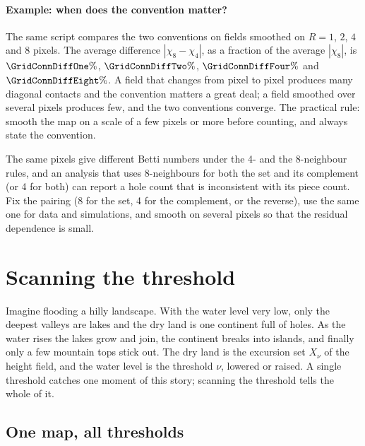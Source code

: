 \paragraph{Example: when does the convention matter?} The same script compares the two conventions on fields
smoothed on $R=1$, $2$, $4$ and $8$ pixels. The average difference $|\chi_8-\chi_4|$, as a fraction of the
average $|\chi_8|$, is $\GridConnDiffOne\%$, $\GridConnDiffTwo\%$, $\GridConnDiffFour\%$ and
$\GridConnDiffEight\%$. A field that changes from pixel to pixel produces many diagonal contacts and the
convention matters a great deal; a field smoothed over several pixels produces few, and the two conventions
converge. The practical rule: smooth the map on a scale of a few pixels or more before counting, and always
state the convention.

\begin{pitfall}
The same pixels give different Betti numbers under the 4- and the 8-neighbour rules, and an analysis that
uses 8-neighbours for both the set and its complement (or 4 for both) can report a hole count that is
inconsistent with its piece count. Fix the pairing (8 for the set, 4 for the complement, or the reverse),
use the same one for data and simulations, and smooth on several pixels so that the residual dependence is
small.
\end{pitfall}
\section{Scanning the threshold}
\label{12a:sec:scan}

Imagine flooding a hilly landscape. With the water level very low, only the deepest valleys are lakes and
the dry land is one continent full of holes. As the water rises the lakes grow and join, the continent breaks
into islands, and finally only a few mountain tops stick out. The dry land is the excursion set $X_\nu$ of
the height field, and the water level is the threshold $\nu$, lowered or raised. A single threshold catches
one moment of this story; scanning the threshold tells the whole of it.

\subsection{One map, all thresholds}
\label{12a:sec:onemap}

